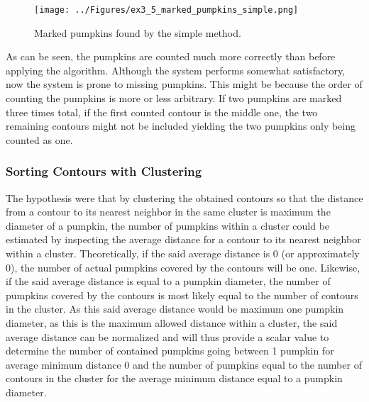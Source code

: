 \documentclass[../Head/Main.tex]{subfiles}
\begin{document}
\begin{figure}[H]
\centering
\texttt{[image: ../Figures/ex3\_5\_marked\_pumpkins\_simple.png]}
\caption{Marked pumpkins found by the simple method.}
\label{fig:pumpkinsSimple}
\end{figure}

As can be seen, the pumpkins are counted much more correctly than before applying the algorithm. Although the system performs somewhat satisfactory, now the system is prone to missing pumpkins. This might be because the order of counting the pumpkins is more or less arbitrary. If two pumpkins are marked three times total, if the first counted contour is the middle one, the two remaining contours might not be included yielding the two pumpkins only being counted as one. 

\subsubsection{Sorting Contours with Clustering}
The hypothesis were that by clustering the obtained contours so that the distance from a contour to its nearest neighbor in the same cluster is maximum the diameter of a pumpkin, the number of pumpkins within a cluster could be estimated by inspecting the average distance for a contour to its nearest neighbor within a cluster. Theoretically, if the said average distance is 0 (or approximately 0), the number of actual pumpkins covered by the contours will be one. Likewise, if the said average distance is equal to a pumpkin diameter, the number of pumpkins covered by the contours is most likely equal to the number of contours in the cluster. As this said average distance would be maximum one pumpkin diameter, as this is the maximum allowed distance within a cluster, the said average distance can be normalized and will thus provide a scalar value to determine the number of contained pumpkins going between 1 pumpkin for average minimum distance 0 and the number of pumpkins equal to the number of contours in the cluster for the average minimum distance equal to a pumpkin diameter.\\
\end{document}
